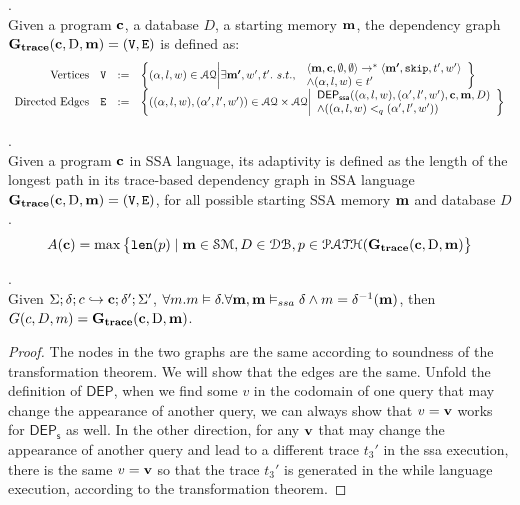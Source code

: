\documentclass[a4paper,11pt]{article}
\begin{document}
%
%
\begin{defn}
.
\\
{
Given a program ${\boldsymbol{\mathbf{c}}}$, a database $D$, a starting memory ${\boldsymbol{\mathbf{m}}}$,
the dependency graph $\bf{G_{trace}}({\boldsymbol{\mathbf{c}}},\text{D},{\boldsymbol{\mathbf{m}}}) = (\mathtt{V}, \mathtt{E})$ is defined as: \\
\[
\begin{array}{rlcl}
	\text{Vertices} &
	\vertxs & := & \left\{ 
	({\qval}, l,w) \in \mathcal{AQ} \middle\vert
	\exists \ssa{m'},  w', t'.  ~ s.t., ~  
	\begin{array}{l}
	\config{\ssa{m} ,\ssa{c}, \emptyset, \emptyset}  
	\to^{*}  
	\config{\ssa{m'} , \eskip, t', w' }
	\\ 
	\land ({\qval}, l, w) \in t'
	\end{array}
	\right\}
	\\
	\text{Directed Edges} &
	\edges & := & 
	\left\{ 
	(({\qval},l,w),({\qval}',l',w')) \in \mathcal{AQ} \times \mathcal{AQ} 
	\middle\vert
	\begin{array}{l}
		\mathsf{DEP_{ssa}}(({\qval},l,w), ({\qval}',l',w'),
		\ssa{c},\ssa{m},D) 
		\\ \land 
		(({\qval},l,w) <_q ({\qval}',l',w'))
	\end{array}
	\right\}
\end{array}
\]
}
\end{defn}
%
\begin{defn}
.
\\
Given a program ${\boldsymbol{\mathbf{c}}}$ in SSA language, 
its adaptivity is defined as the length of the longest path in its trace-based dependency graph in SSA language 
$\bf{G_{trace}}({\boldsymbol{\mathbf{c}}}, \text{D},{\boldsymbol{\mathbf{m}}}) = (\mathtt{V}, \mathtt{E})$, 
for all possible starting SSA memory ${\boldsymbol{\mathbf{m}}}$ and database $D$.
%
%
$$
A({\boldsymbol{\mathbf{c}}}) = \max \big 
\{ \mathtt{len}(p) \mid {\boldsymbol{\mathbf{m}}} \in \mathcal{SM},D \in \mathcal{DB} ,p \in \mathcal{PATH}(\bf{G_{trace}}({\boldsymbol{\mathbf{c}}}, \text{D}, {\boldsymbol{\mathbf{m}}}) \big \} 
$$
\end{defn}
%
%
\begin{thm}.
\\
{
Given $\Sigma; \delta ; c \hookrightarrow {\boldsymbol{\mathbf{c}}} ; \delta';\Sigma' $,
$\forall m. m \vDash \delta. \forall {\boldsymbol{\mathbf{m}}}, {\boldsymbol{\mathbf{m}}} \vDash_{ssa} \delta \land m = \delta^{-1}({\boldsymbol{\mathbf{m}}})$, 
then $G(c,D,m) = \bf{G_{trace}}({\boldsymbol{\mathbf{c}}}, \text{D},{\boldsymbol{\mathbf{m}}}) $.
}
\end{thm}
%
\begin{proof}
 The nodes in the two graphs are the same according to soundness of the transformation theorem. We will show that the edges are the same. Unfold the definition of $\mathsf{DEP}$, when we find some $v$ in the codomain of one query that may change the appearance of another query,  we can always show that $v = {\boldsymbol{\mathbf{v}}}$ works for $\mathsf{DEP_s}$ as well. In the other direction, for any ${\boldsymbol{\mathbf{v}}}$ that may change the appearance of another query and lead to a different trace $t_3'$ in the ssa execution, there is the same $v = {\boldsymbol{\mathbf{v}}}$ so that the trace $t_3'$ is generated in the while language execution, according to the transformation theorem.  
\end{proof}
\end{document}

